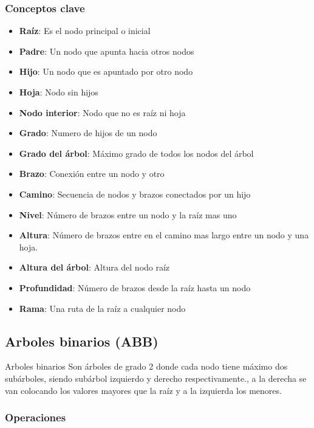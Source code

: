 \documentclass{beamer}
\begin{document}
\begin{frame}[allowframebreaks]
	\frametitle{Conceptos clave}
	\begin{itemize}
		\item \textbf{Ra\'iz}: Es el nodo principal o inicial
		\item \textbf{Padre}:  Un nodo que apunta hacia otros nodos
		\item \textbf{Hijo}:  Un nodo que es apuntado por otro nodo
		\item \textbf{Hoja}:  Nodo sin hijos
		\item \textbf{Nodo interior}: Nodo que no es ra\'iz ni hoja
		\item \textbf{Grado}: Numero de hijos de un nodo
		\item \textbf{Grado del \'arbol}: M\'aximo grado de todos los nodos del \'arbol
		\item \textbf{Brazo}: Conexi\'on entre un nodo y otro
		\item \textbf{Camino}: Secuencia de nodos y brazos conectados por un hijo
		\item \textbf{Nivel}:  N\'umero de brazos entre un nodo y la ra\'iz mas uno
		\item \textbf{Altura}: N\'umero de brazos entre en el camino mas largo entre un nodo y una hoja.
		\item \textbf{Altura del \'arbol}:  Altura del nodo ra\'iz
		\item \textbf{Profundidad}: N\'umero de brazos desde la ra\'iz hasta un nodo
		\item \textbf{Rama}: Una ruta de la ra\'iz a cualquier nodo  
	\end{itemize}
\end{frame}

\subsection{Arboles binarios (ABB)}

\begin{frame}{Arboles binarios}
	Son \'arboles de grado 2 donde cada nodo  tiene m\'aximo dos sub\'arboles, siendo sub\'arbol izquierdo y derecho respectivamente., a la derecha se van colocando los valores mayores que la ra\'iz y a la izquierda los menores.
\end{frame}

\subsubsection{Operaciones}
\end{document}
